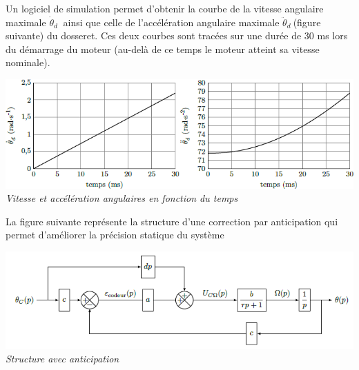 \documentclass[10pt,fleqn]{article} %
\begin{document}
\begin{multicols}{2}
Un logiciel de simulation permet d'obtenir la courbe de la vitesse angulaire maximale \({\dot{\theta}}_{d}\ \) ainsi que celle de l'accélération angulaire maximale
\({\ddot{\theta}}_{d}\ \)(figure suivante) du dosseret. Ces deux courbes sont tracées sur une durée de 30 ms lors du démarrage du moteur (au-delà de  ce temps le moteur atteint sa vitesse nominale).

\begin{center}
\includegraphics[width=1.0\linewidth]{images/image16.png}
\textit{Vitesse et accélération angulaires en fonction du
temps \label{fig15}}
\end{center}


%
%  
%  


La figure suivante représente la structure d'une correction par anticipation
qui permet d'améliorer la précision statique du système

\begin{center}
\includegraphics[width=1.0\linewidth]{images/image17.png}
\textit{Structure avec anticipation \label{fig16}}
\end{center}


\end{multicols}
\end{document}
